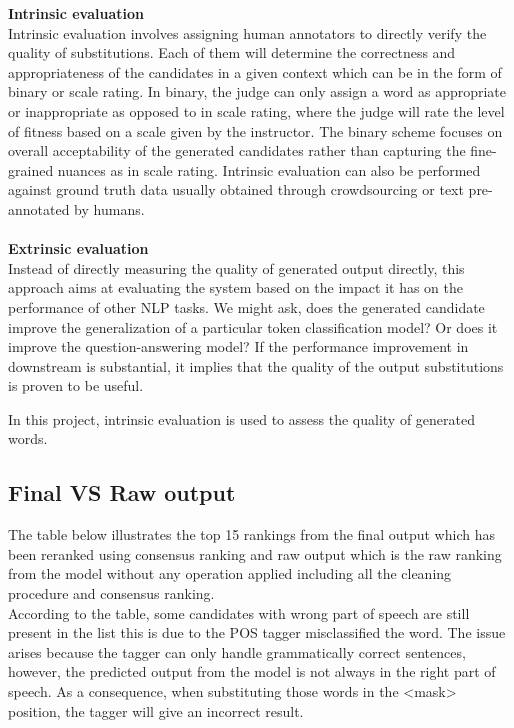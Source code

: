 \documentclass[12pt,oneside,openright,a4paper]{cpe-english-project}
\begin{document}
\textbf{Intrinsic evaluation}\\
Intrinsic evaluation involves assigning human annotators to directly verify the quality of substitutions.
Each of them will determine the correctness and appropriateness of the candidates in a given context which can be in the form of binary or scale rating. In binary, the judge can only assign a word as appropriate or inappropriate as opposed to in scale rating, where the judge will rate the level of fitness based on a scale given by the instructor.
The binary scheme focuses on overall acceptability of the generated candidates rather than capturing the fine-grained nuances as in scale rating. Intrinsic evaluation can also be performed against ground truth data usually obtained through crowdsourcing or text pre-annotated by humans.
\\\\
\textbf{Extrinsic evaluation}\\
Instead of directly measuring the quality of generated output directly, this approach aims at evaluating the system based on the impact it has on the performance of other NLP tasks. We might ask, does the generated candidate improve the generalization of a particular token classification model? Or does it improve the question-answering model? If the performance improvement in downstream is substantial, it implies that the quality of the output substitutions is proven to be useful\cite{r}. 

In this project, intrinsic evaluation is used to assess the quality of generated words.

\subsection{Final VS Raw output}
The table below illustrates the top 15 rankings from the final output which has been reranked using consensus ranking and raw output which is the raw ranking from the model without any operation applied including all the cleaning procedure and consensus ranking.
\\
According to the table, some candidates with wrong part of speech are still present in the list this is due to the POS tagger misclassified the word. The issue arises because the tagger can only handle grammatically correct sentences, however, the predicted output from the model is not always in the right part of speech. As a consequence, when substituting those words in the <mask> position, the tagger will give an incorrect result. 
\\\\
\end{document}

